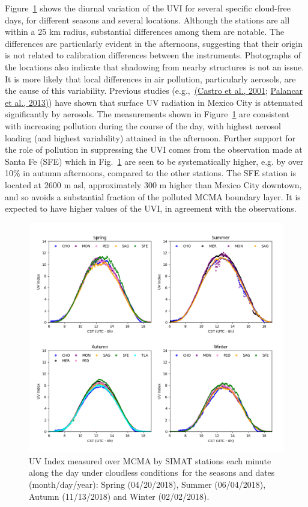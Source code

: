 \documentclass[10pt]{article}
\begin{document}
Figure~{\ref{358425}} shows the diurnal variation of
the UVI for several specific cloud-free days, for different seasons and
several locations. Although the stations are all within a 25 km radius,
substantial differences among them are notable. The differences are
particularly evident in the afternoons, suggesting that their origin is
not related to calibration differences between the instruments.
Photographs of the locations also indicate that shadowing from nearby
structures is not an issue. It is more likely that local differences in
air pollution, particularly aerosols, are the cause of this variability.
Previous studies (e.g.,~\hyperref[csl:14]{(Castro et al., 2001}; \hyperref[csl:13]{Palancar et al., 2013)}) have shown that surface UV
radiation in Mexico City is attenuated significantly by aerosols. The
measurements shown in Figure~{\ref{358425}} are
consistent with increasing pollution during the course of the day, with
highest aerosol loading (and highest variability) attained in the
afternoon. Further support for the role of pollution in suppressing the
UVI comes from the observation made at Santa Fe (SFE) which in
Fig.~{\ref{358425}} are seen to be systematically
higher, e.g. by over 10\% in autumn afternoons, compared to the other
stations. The SFE station is located at 2600 m asl, approximately 300 m
higher than Mexico City downtown, and so avoids a substantial fraction
of the polluted MCMA boundary layer. It is expected to have higher
values of the UVI, in agreement with the observations.
\begin{figure}[H]
\begin{center}
\includegraphics[width=0.98\columnwidth]{figures/season}
\caption{{UV Index measured over MCMA by SIMAT stations each minute along the day
under cloudless conditions~for the seasons and dates (month/day/year):
Spring (04/20/2018), Summer (06/04/2018),~ Autumn (11/13/2018) and
Winter (02/02/2018).
{\label{358425}}%
}}
\end{center}
\end{figure}
\end{document}
